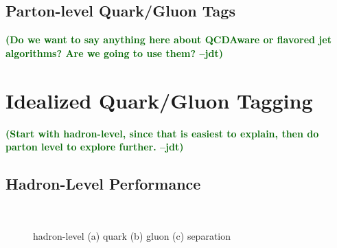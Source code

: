 \documentclass[11pt,letterpaper]{article}
\newcommand{\jdt}[1]{\textbf{\textcolor{darkgreen}{(#1 --jdt)}}}
\begin{document}
\subsection{Parton-level Quark/Gluon Tags}

\jdt{Do we want to say anything here about QCDAware or flavored jet algorithms?  Are we going to use them?}

\section{Idealized Quark/Gluon Tagging}
\label{sec:ee}

\jdt{Start with hadron-level, since that is easiest to explain, then do parton level to explore further.}

\subsection{Hadron-Level Performance}

\begin{figure}
\centering
{}
$\quad$
$\quad$
\caption{hadron-level (a) quark (b) gluon (c) separation}
\end{figure}
\end{document}
